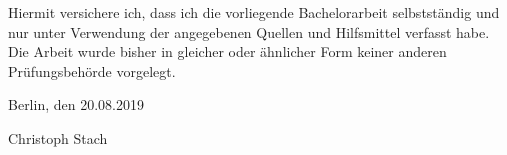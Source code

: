 
Hiermit versichere ich, dass ich die vorliegende Bachelorarbeit selbstständig und nur unter Verwendung der angegebenen Quellen und Hilfsmittel verfasst habe. Die Arbeit wurde bisher in gleicher oder ähnlicher Form keiner anderen Prüfungsbehörde vorgelegt.

\vskip 1cm

Berlin, den 20.08.2019

\vskip 1.5cm

Christoph Stach
